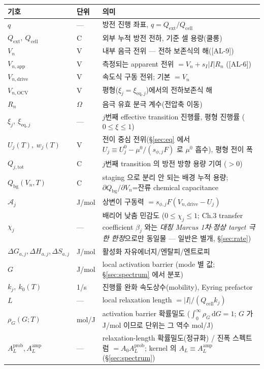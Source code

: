 \documentclass[11pt,a4paper]{article}
\newcommand{\dd}{\mathrm{d}}
\newcommand{\eq}{\mathrm{eq}}
\newcommand{\app}{\mathrm{app}}
\newcommand{\drive}{\mathrm{drive}}
\newcommand{\bg}{\mathrm{bg}}
\newcommand{\cell}{\mathrm{cell}}
\newcommand{\ext}{\mathrm{ext}}
\newcommand{\OCV}{\mathrm{OCV}}
\newcommand{\tot}{\mathrm{tot}}
\newcommand{\AL}[1]{\textsf{[AL-#1]}}
\begin{document}
\begin{longtable}{p{} p{} p{}}
\toprule 기호 & 단위 & 의미 \\ \midrule \endhead
$q$ & --- & 방전 진행 좌표, $q=Q_\ext/Q_\cell$ \\
$Q_\ext,\ Q_\cell$ & C & 외부 누적 방전 전하, 기준 셀 용량(쿨롱) \\
$V_n$ & V & 내부 음극 전위 — 전하 보존식의 해(\AL{9}) \\
$V_{n,\app}$ & V & 측정되는 apparent 전위 $=V_n+s_I|I|R_n$ (\AL{6}) \\
$V_{n,\drive}$ & V & 속도식 구동 전위; 기본 $=V_n$ \\
$V_{n,\OCV}$ & V & 평형($\xi_j=\xi_{\eq,j}$)에서의 전하보존식 해 \\
$R_n$ & $\Omega$ & 음극 유효 분극 계수(전압축 이동) \\
$\xi_j,\ \xi_{\eq,j}$ & --- & $j$번째 effective transition 진행률, 평형 진행률 ($0\!\le\!\xi\!\le\!1$) \\
$U_j(T),\ w_j(T)$ & V & 전이 중심 전위(\S\ref{sec:eq} 에서 $U_j\equiv U_j^0-\mu^0/(s_{\phi,j}F)$ 로 $\mu^0$ 흡수), 평형 전이 폭 \\
$Q_{j,\tot}$ & C & $j$번째 transition 의 방전 방향 용량 기여 ($>0$) \\
$Q_\bg(V_n,T)$ & C & staging 으로 분리 안 되는 배경 누적 용량; $\partial Q_\bg/\partial V_n$=잔류 chemical capacitance \\
$\mathcal A_j$ & J/mol & 상변이 구동력 $=s_{\phi,j}F(V_{n,\drive}-U_j)$ \\
$\chi_j$ & --- & 배리어 낮춤 민감도 ($0\le\chi_j\le1$; Ch.3 transfer coefficient $\beta_j$ 와는 \emph{대칭 Marcus 1차$\cdot$정상 target 극한 한정}으로만 동일물 — 일반은 별개, \S\ref{sec:rate}) \\
$\Delta G_{a,j},\Delta H_{a,j},\Delta S_{a,j}$ & J/mol & 활성화 자유에너지/엔탈피/엔트로피 \\
$G$ & J/mol & local activation barrier (mode 별 값; \S\ref{sec:spectrum} 에서 분포) \\
$k_j,\ k_0(T)$ & 1/s & 진행률 완화 속도상수(mobility), Eyring prefactor \\
$L$ & --- & local relaxation length $=|I|/(Q_\cell k_j)$ \\
$\rho_G(G;T)$ & mol/J & activation barrier 확률밀도 ($\int_0^\infty\rho_G\,\dd G=1$; $G$ 가 J/mol 이므로 단위는 그 역수 mol/J) \\
$A_L^{\mathrm{prob}},A_L^{\mathrm{amp}}$ & --- & relaxation-length 확률밀도(정규화) / 진폭 스펙트럼 $=A_0 A_L^{\mathrm{prob}}$; kernel 의 $A_L\equiv A_L^{\mathrm{amp}}$ (\S\ref{sec:spectrum}) \\

\end{longtable}
\end{document}
